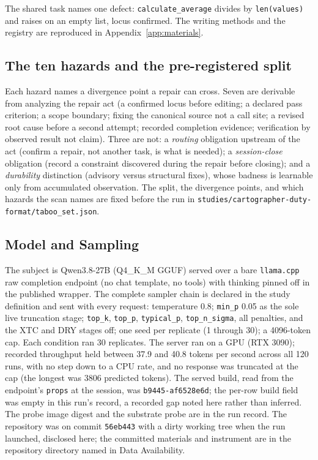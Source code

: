 \documentclass[11pt,a4paper]{article}
\begin{document}
The shared task names one defect: \texttt{calculate\_average} divides by
\texttt{len(values)} and raises on an empty list, locus confirmed. The writing
methods and the registry are reproduced in Appendix~\ref{app:materials}.

\subsection{The ten hazards and the pre-registered split}

Each hazard names a divergence point a repair can cross. Seven are derivable
from analyzing the repair act (a confirmed locus before editing; a declared pass
criterion; a scope boundary; fixing the canonical source not a call site; a
revised root cause before a second attempt; recorded completion evidence;
verification by observed result not claim). Three are not: a \emph{routing}
obligation upstream of the act (confirm a repair, not another task, is what is
needed); a \emph{session-close} obligation (record a constraint discovered
during the repair before closing); and a \emph{durability} distinction
(advisory versus structural fixes), whose badness is learnable only from
accumulated observation. The split, the divergence points, and which hazards the
scan names are fixed before the run in \texttt{studies/cartographer-duty-format/taboo\_set.json}.

\subsection{Model and Sampling}\label{sec:sampling}

The subject is Qwen3.8-27B (Q4\_K\_M GGUF) served over a bare \texttt{llama.cpp}
raw completion endpoint (no chat template, no tools) with thinking pinned
off in the published wrapper. The complete sampler chain is declared in the
study definition and sent with every request: temperature 0.8; \texttt{min\_p}
0.05 as the sole live truncation stage; \texttt{top\_k}, \texttt{top\_p},
\texttt{typical\_p}, \texttt{top\_n\_sigma}, all penalties, and the XTC and DRY
stages off; one seed per replicate (1 through 30); a 4096-token cap. Each
condition ran 30 replicates. The server ran on a GPU (RTX 3090); recorded
throughput held between 37.9 and 40.8 tokens per second across all 120 runs,
with no step down to a CPU rate, and no response was truncated at the cap (the
longest was 3806 predicted tokens). The served build, read from the endpoint's
\texttt{props} at the session, was \texttt{b9445-af6528e6d}; the per-row build
field was empty in this run's record, a recorded gap noted here rather than
inferred. The probe image digest and the substrate probe are in the run record.
The repository was on commit \texttt{56eb443} with a dirty working tree when the
run launched, disclosed here; the committed materials and instrument are in the
repository directory named in Data Availability.
\end{document}
